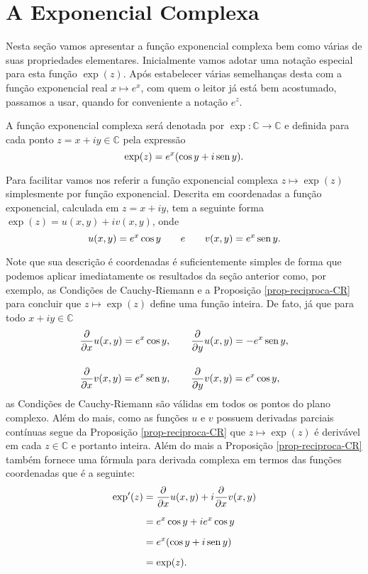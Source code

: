 \section{A Exponencial Complexa}

Nesta seção vamos apresentar a função exponencial complexa bem como várias de suas propriedades
elementares. Inicialmente vamos adotar uma notação especial para esta função $\exp(z)$.
Após estabelecer várias semelhanças desta com a função exponencial real $x\longmapsto e^x$,
com quem o leitor já está bem acostumado, passamos a usar, quando for conveniente 
a notação $e^z$. 


\begin{definicao}
\label{def-func-exp}
A função exponencial complexa será denotada por 
$\exp:\mathbb{C}\to\mathbb{C}$ e definida para cada ponto
$z=x+iy\in\mathbb{C}$ pela expressão 
\[
\exp(z) = e^{x}(\cos y+i\operatorname{sen} y).
\]	
\end{definicao} 

Para facilitar vamos nos referir a função exponencial complexa $z\longmapsto \exp(z)$ 
simplesmente por função exponencial. Descrita em coordenadas a função exponencial,
calculada em $z=x+iy$,
tem a seguinte forma $\exp(z)=u(x,y)+iv(x,y)$, onde
\[
u(x,y)= e^{x}\cos y   \qquad{e}\qquad v(x,y)=e^x\operatorname{sen} y. 
\]

Note que sua descrição é coordenadas é suficientemente simples 
de forma que podemos aplicar imediatamente os
resultados da seção anterior como, por exemplo, as Condições de 
Cauchy-Riemann e a Proposição \ref{prop-reciproca-CR} para
concluir que $z\longmapsto \exp(z)$ define uma função inteira. De fato,
já que para todo $x+iy\in\mathbb{C}$
\begin{align*}
&\frac{\partial}{\partial x}u(x,y) = e^{x}\cos y,
\qquad 
\frac{\partial}{\partial y}u(x,y) = -e^{x}\operatorname{sen} y,
\\[0.4cm]
&\frac{\partial}{\partial x}v(x,y) = e^{x}\operatorname{sen} y,
\qquad 
\frac{\partial}{\partial y}v(x,y) = e^{x}\cos y,
\end{align*}
as Condições de Cauchy-Riemann são válidas em todos os pontos do plano complexo.
Além do mais, como as funções $u$ e $v$ possuem derivadas parciais contínuas segue 
da Proposição \ref{prop-reciproca-CR} que $z\longmapsto \exp(z)$ é derivável em 
cada $z\in\mathbb{C}$ e portanto inteira.
Além do mais a Proposição \ref{prop-reciproca-CR} também 
fornece uma fórmula para derivada complexa em termos das funções coordenadas que é a seguinte:
\begin{align*}
\exp'(z) 
&= 
\frac{\partial}{\partial x}u(x,y) +i \frac{\partial}{\partial x}v(x,y) 
\\[0.2cm]
&=
e^{x}\cos y+i e^{x}\cos y 
\\[0.2cm]
&= e^x(\cos y+i\operatorname{sen} y)
\\[0.2cm]
&=
\exp(z).
\end{align*}

